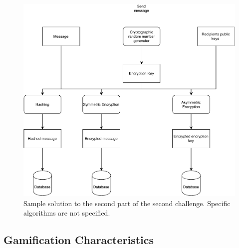 \documentclass{l4proj}
\begin{document}
\begin{figure}[b]
    \centering
    \includegraphics[width=\textwidth, frame]{images/Questline2Part2Cropped.pdf}
    \caption{Sample solution to the second part of the second challenge. 
    Specific algorithms are not specified.}
    \label{fig:Challenge2}
\end{figure}

\subsection{Gamification Characteristics}
\end{document}

